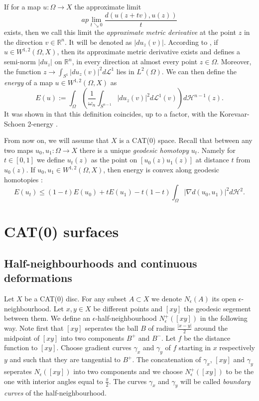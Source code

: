 \documentclass[a4paper,10pt]{amsart}
\begin{document}
If for a map $u:\Omega\to X$ the  approximate limit
$$
ap\lim_{t\searrow 0}\frac{d(u(z+tv),u(z))}{t}
$$
exists, then we call this limit the {\em approximate metric derivative} at the point $z$ in the direction $v\in\mathbb{R}^n$. It will be denoted
as $|du_z(v)|$. According to
\cite[Prop.4.3]{LW}, if $u\in W^{1,2}(\Omega,X)$, then its approximate metric derivative exists and defines a semi-norm $|du_z|$ on $\mathbb{R}^n$, 
in every direction at almost every point $z\in\Omega$. Moreover, the function $z\to\int_{S^1}|du_z(v)|^2 d\mathcal{L}^1$ lies in $L^2(\Omega)$.
We can then define the {\em energy} of a map $u\in W^{1,2}(\Omega,X)$ as
$$
E(u):=\int_\Omega\left(\frac{1}{\omega_n}\int_{S^{n-1}}|du_z(v)|^2 d\mathcal{L}^1(v)\right)d\mathcal{H}^{n-1}(z).
$$
It was shown in \cite{LW} that this definition coincides, up to a factor, with the Korevaar-Schoen 2-energy \cite{KS}.

From now on, we will assume that $X$ is a CAT(0) space. Recall that between any two maps $u_0,u_1:\Omega\to X$ there is 
a unique {\em geodesic homotopy} $u_t$. Namely for $t\in[0,1]$ we define $u_t(z)$ as the point on $[u_0(z)u_1(z)]$ at distance $t$
from $u_0(z)$. If $u_0, u_1\in W^{1,2}(\Omega,X)$, then energy is convex along geodesic homotopies \cite[(2.2vi)]{KS}:
$$
E(u_t)\leq (1-t)E(u_0)+tE(u_1)-t(1-t)\int_\Omega|\nabla d(u_0,u_1)|^2d\mathcal{H}^2.
$$


\section{CAT(0) surfaces}

\subsection{Half-neighbourhoods and continuous deformations}

Let $X$ be a CAT(0) disc. For any subset $A\subset X$ we denote $N_\epsilon (A)$ its open $\epsilon$-neighbourhood.
Let $x,y\in X$ be different points and $[xy]$ the geodesic segement between them. We define an $\epsilon$-half-neighbourhood
$N^+_\epsilon ([xy])$ in the following way. Note first that $[xy]$ seperates the ball $B$ of radius $\frac{|x-y|}{2}$ around
the midpoint of $[xy]$ into two components $B^+$ and $B^-$. Let $f$ be the distance function to $[xy]$. Choose gradient curves 
$\gamma_x$ and $\gamma_y$ of $f$ starting in $x$ respectively $y$ and such that they are tangential to $B^+$. The concatenation
of $\gamma_x$, $[xy]$ and $\gamma_y$ seperates $N_\epsilon([xy])$ into two components and we choose $N^+_\epsilon ([xy])$ to be the one
with interior angles equal to  $\frac{\pi}{2}$. The curves $\gamma_x$ and $\gamma_y$ will be called {\em boundary curves} of the 
half-neighbourhood.
\end{document}
